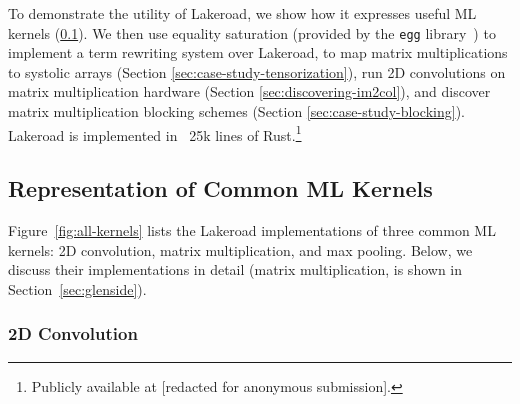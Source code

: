 \documentclass[prologue, dvipsnames, sigplan, screen, review, anonymous]{acmart}
\newcommand{\g}{Lakeroad\xspace}
\begin{document}
To demonstrate
  the utility of \g,
  we show how it expresses
  useful ML kernels
  (\ref{section:representing-kernels}).
We then use
  equality saturation
  (provided by the \texttt{egg} library~\cite{willsey2021egg})
  to implement a term rewriting system
  over \g, to
  map matrix multiplications
  to systolic arrays
  (Section \ref{sec:case-study-tensorization}),
  run 2D convolutions on matrix multiplication hardware
  (Section \ref{sec:discovering-im2col}),
  and discover
  matrix multiplication
  blocking schemes
  (Section \ref{sec:case-study-blocking}).
\g is implemented in ~25k lines of
  Rust.\footnote{Publicly available at [redacted for anonymous submission].}
  
  
\subsection{Representation of Common ML Kernels}
\label{section:representing-kernels}

Figure~\ref{fig:all-kernels}
  lists the \g implementations
  of three common ML kernels:
  2D convolution,
  matrix multiplication,
  and max pooling.
Below, we discuss
  their implementations in detail
  (matrix multiplication,
  is shown in Section~\ref{sec:glenside}).
  
\subsubsection{2D Convolution}
\end{document}
